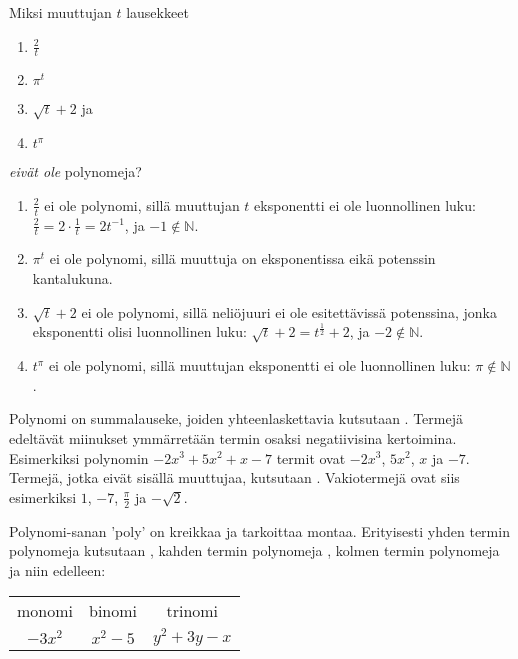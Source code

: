 \begin{esimerkki}

Miksi muuttujan $t$ lausekkeet 
\begin{enumerate}
\item $\frac{2}{t}$
\item $\pi^t$
\item $\sqrt{t}+2$ ja
\item $t^\pi$
\end{enumerate}

\emph{eivät ole} polynomeja?

	\begin{esimratk}

\begin{enumerate}
\item $\frac{2}{t}$ ei ole polynomi, sillä muuttujan $t$ eksponentti ei ole luonnollinen luku: $\frac{2}{t}=2 \cdot \frac{1}{t}= 2t^{-1}$, ja $-1 \notin \mathbb{N}$.
\item $\pi^t$ ei ole polynomi, sillä muuttuja on eksponentissa eikä potenssin kantalukuna.
\item $\sqrt{t}+2$ ei ole polynomi, sillä neliöjuuri ei ole esitettävissä potenssina, jonka eksponentti olisi luonnollinen luku: $\sqrt{t}+2=t^{\frac{1}{2}}+2$, ja $-2 \notin \mathbb{N}$.
\item $t^{\pi}$ ei ole polynomi, sillä muuttujan eksponentti ei ole luonnollinen luku: $\pi \notin \mathbb{N}$.
\end{enumerate}

	\end{esimratk}
\end{esimerkki}

Polynomi on summalauseke, joiden yhteenlaskettavia kutsutaan . Termejä edeltävät miinukset ymmärretään termin osaksi negatiivisina kertoimina. Esimerkiksi polynomin $-2x^3+5x^2+x-7$ termit ovat $-2x^3$, $5x^2$, $x$ ja $-7$. Termejä, jotka eivät sisällä muuttujaa, kutsutaan  . Vakiotermejä ovat siis esimerkiksi $1$, $-7$, $\frac{\pi}{2}$ ja $-\sqrt{2}$.


Polynomi-sanan 'poly' on kreikkaa ja tarkoittaa montaa. Erityisesti yhden termin polynomeja kutsutaan , kahden termin polynomeja , kolmen termin polynomeja  ja niin edelleen:
\begin{center}\begin{tabular}{ccc}
monomi	& binomi 	&	trinomi \\
$-3x^2$   &	$x^2-5$	& $y^2+3y-x$
 \end{tabular} \end{center}

